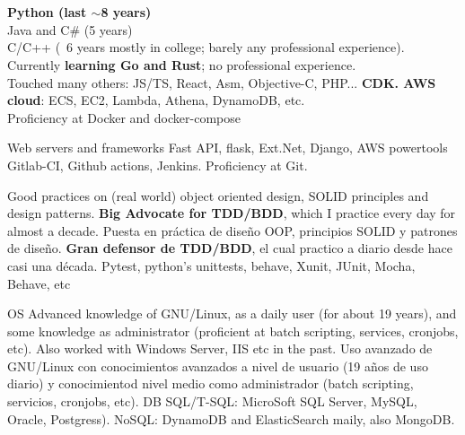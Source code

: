\section{}


\cvcomputer
    {}
        {\textbf{Python (last $\sim$8 years)}
        \\ Java and C\# (5 years)
        \\ C/C++ (~6 years mostly in college; barely any professional experience).
        \\ Currently \textbf{learning Go and Rust}; no professional experience.
        \\ Touched many others: JS/TS, React, Asm, Objective-C, PHP...}
    {}
        {\textbf{CDK. AWS cloud}: ECS, EC2, Lambda, Athena, DynamoDB, etc. \\
        Proficiency at Docker and docker-compose}


\cvcomputer
    {Web servers and frameworks}
        {Fast API, flask, Ext.Net, Django, AWS powertools}
    {}
        {Gitlab-CI, Github actions, Jenkins. Proficiency at Git.}


\cvcomputer
    {}
        {\ml
            {Good practices on (real world) object oriented design, SOLID principles and
            design patterns. \textbf{Big Advocate for TDD/BDD}, which I practice every
            day for almost a decade.}
            {Puesta en práctica de diseño OOP, principios SOLID y patrones de
            diseño. \textbf{Gran defensor de TDD/BDD}, el cual practico a
            diario desde hace casi una década.}
        }
    {}
        {Pytest, python's unittests, behave, Xunit, JUnit, Mocha, Behave, etc}



\cvcomputer
    {OS}
        {\ml
            {Advanced knowledge of GNU/Linux, as a daily user (for about 19
            years), and some knowledge as administrator (proficient at batch scripting,
            services, cronjobs, etc). Also worked with Windows Server, IIS etc
            in the past.}
            {Uso avanzado de GNU/Linux con conocimientos avanzados a nivel de
            usuario (19 años de uso diario) y conocimientod nivel medio como
            administrador (batch scripting, servicios, cronjobs, etc).}
        }
    {DB}
        {SQL/T-SQL: MicroSoft SQL Server, MySQL, Oracle, Postgress). NoSQL:
        DynamoDB and ElasticSearch maily, also MongoDB.}
